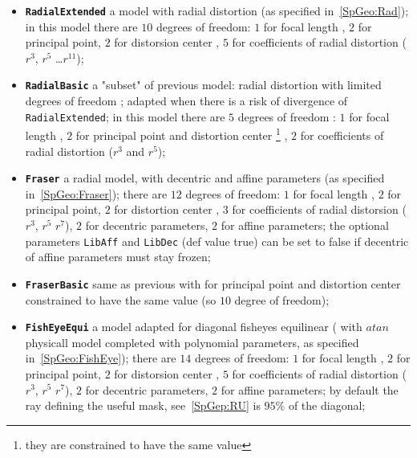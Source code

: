 \begin{itemize}

   \item {\tt \bf RadialExtended} a model with radial distortion 
         (as specified in~\ref{SpGeo:Rad}); 
         in this model there are $10$ degrees of freedom:
         $1$ for focal length  , $2$ for principal point, $2$ for distorsion center , 
         $5$ for coefficients of radial distortion ($r^3$, $r^5$ \dots $r^{11}$);

   \item {\tt \bf RadialBasic}  a "subset" of previous model:
          radial distortion with limited degrees of freedom ;
         adapted when there is a risk of divergence of {\tt RadialExtended}; 
         in this model there are $5$ degrees of freedom :  $1$ for focal length  , 
         $2$ for principal point and distortion center \footnote{they are constrained to have 
         the same value} ,
         $2$ for coefficients of radial distortion ($r^3$ and  $r^5$);



   \item {\tt \bf Fraser}  a radial model, with decentric and affine parameters
          (as specified in~\ref{SpGeo:Fraser}); there are $12$ degrees of freedom:
         $1$ for focal length  , $2$ for principal point, $2$ for distortion center , 
         $3$ for coefficients of radial distorsion ($r^3$, $r^5$  $r^7$),
         $2$ for decentric parameters, $2$ for affine parameters;
         the optional parameters {\tt LibAff} and {\tt LibDec} (def value true) can
         be set to false if decentric of affine parameters must stay frozen;


   \item {\tt \bf FraserBasic}  same as previous with for principal point and distortion center
         constrained to have the same value (so $10$ degree of freedom);

   \item {\tt \bf FishEyeEqui}  a model adapted for diagonal fisheyes equilinear
         ( with $atan$ physicall model completed with polynomial parameters,
          as specified in~\ref{SpGeo:FishEye}); there are $14$ degrees of freedom:
         $1$ for focal length  , $2$ for principal point, $2$ for distorsion center , 
         $5$ for coefficients of radial distortion ($r^3$, $r^5$  $r^7$),
         $2$ for decentric parameters, $2$ for affine parameters;
         by default the ray defining the useful mask, see~\ref{SpGep:RU}
         is $95\%$ of the diagonal;



\end{itemize}
